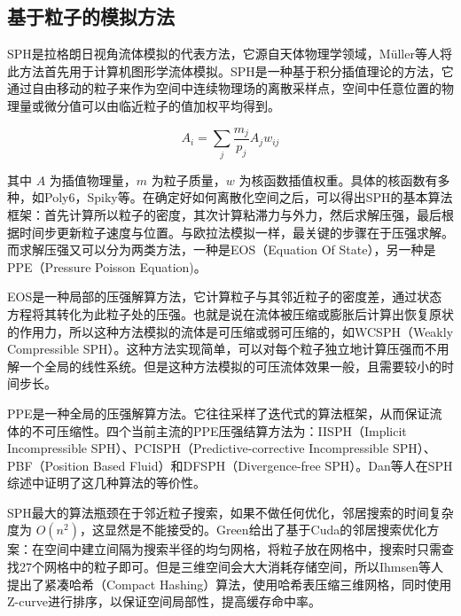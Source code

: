 \subsection{基于粒子的模拟方法}

    SPH是拉格朗日视角流体模拟的代表方法，它源自天体物理学领域\cite{M92SPH, CR99SPH}，Müller\cite{MCG03SPH}等人将此方法首先用于计算机图形学流体模拟。SPH是一种基于积分插值理论的方法，它通过自由移动的粒子来作为空间中连续物理场的离散采样点，空间中任意位置的物理量或微分值可以由临近粒子的值加权平均得到。

    \begin{equation}
    	A_i = \sum_j \frac {m_j} {p_j} A_j w_{ij}
    \end{equation}
    
    其中 $A$ 为插值物理量，$m$ 为粒子质量，$w$ 为核函数插值权重。具体的核函数有多种，如Poly6，Spiky等\cite{MCG03SPH}。在确定好如何离散化空间之后，可以得出SPH的基本算法框架：首先计算所以粒子的密度，其次计算粘滞力与外力，然后求解压强，最后根据时间步更新粒子速度与位置。与欧拉法模拟一样，最关键的步骤在于压强求解。而求解压强又可以分为两类方法，一种是EOS（Equation Of State），另一种是PPE（Pressure Poisson Equation)\cite{KBS19SPH}。
    
    EOS是一种局部的压强解算方法，它计算粒子与其邻近粒子的密度差，通过状态方程将其转化为此粒子处的压强。也就是说在流体被压缩或膨胀后计算出恢复原状的作用力，所以这种方法模拟的流体是可压缩或弱可压缩的，如WCSPH（Weakly Compressible SPH）\cite{BT07WCSPH}。这种方法实现简单，可以对每个粒子独立地计算压强而不用解一个全局的线性系统。但是这种方法模拟的可压流体效果一般，且需要较小的时间步长。
    
    PPE是一种全局的压强解算方法。它往往采样了迭代式的算法框架，从而保证流体的不可压缩性。四个当前主流的PPE压强结算方法为：IISPH（Implicit Incompressible SPH）\cite{ICS13IISPH}、PCISPH（Predictive-corrective Incompressible SPH）\cite{SP09PCISPH, BET10PCISPH}、PBF（Position Based Fluid）\cite{MM13PBF}和DFSPH（Divergence-free SPH）\cite{BK15DFSPH, BK16DFSPH}。Dan等人在SPH综述\cite{KBS22SPH}中证明了这几种算法的等价性。
    
    SPH最大的算法瓶颈在于邻近粒子搜索，如果不做任何优化，邻居搜索的时间复杂度为 $O(n^2)$，这显然是不能接受的。Green\cite{G10NS}给出了基于Cuda的邻居搜索优化方案：在空间中建立间隔为搜索半径的均匀网格，将粒子放在网格中，搜索时只需查找27个网格中的粒子即可。但是三维空间会大大消耗存储空间，所以Ihmsen\cite{IAB11NS}等人提出了紧凑哈希（Compact Hashing）算法，使用哈希表压缩三维网格，同时使用Z-curve进行排序，以保证空间局部性，提高缓存命中率。

